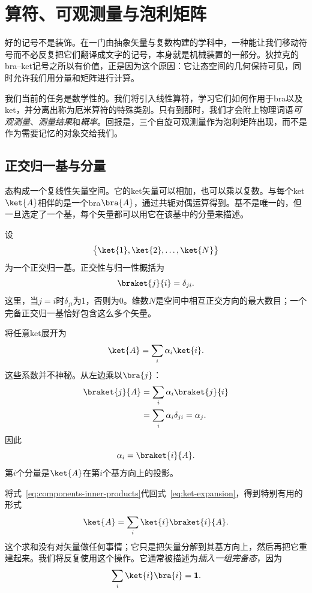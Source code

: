 \chapter{算符、可观测量与泡利矩阵}

好的记号不是装饰。在一门由抽象矢量与复数构建的学科中，一种能让我们移动符号而不必反复把它们翻译成文字的记号，本身就是机械装置的一部分。狄拉克的bra--ket记号之所以有价值，正是因为这个原因：它让态空间的几何保持可见，同时允许我们用分量和矩阵进行计算。

我们当前的任务是数学性的。我们将引入线性算符，学习它们如何作用于bra以及ket，并分离出称为厄米算符的特殊类别。只有到那时，我们才会附上物理词语\emph{可观测量}、\emph{测量结果}和\emph{概率}。回报是，三个自旋可观测量作为泡利矩阵出现，而不是作为需要记忆的对象交给我们。

\section{正交归一基与分量}

态构成一个复线性矢量空间。它的ket矢量可以相加，也可以乘以复数。与每个ket\(\ket{A}\)相伴的是一个bra\(\bra{A}\)，通过共轭对偶运算得到。基不是唯一的，但一旦选定了一个基，每个矢量都可以用它在该基中的分量来描述。

设
\[
\bigl\{\ket{1},\ket{2},\ldots,\ket{N}\bigr\}
\]
为一个正交归一基。正交性与归一性概括为
\begin{equation}
\braket{j}{i}=\delta_{ji}.
\label{eq:orthonormal-basis}
\end{equation}
这里，当\(j=i\)时\(\delta_{ji}\)为1，否则为0。维数\(N\)是空间中相互正交方向的最大数目；一个完备正交归一基恰好包含这么多个矢量。

将任意ket展开为
\begin{equation}
\ket{A}=\sum_i \alpha_i\ket{i}.
\label{eq:ket-expansion}
\end{equation}
这些系数并不神秘。从左边乘以\(\bra{j}\)：
\begin{align}
\braket{j}{A}
 &=\sum_i\alpha_i\braket{j}{i} \\
 &=\sum_i\alpha_i\delta_{ji}
 =\alpha_j.
\end{align}
因此
\begin{equation}
\alpha_i=\braket{i}{A}.
\label{eq:components-inner-products}
\end{equation}
第\(i\)个分量是\(\ket{A}\)在第\(i\)个基方向上的投影。

将式~\eqref{eq:components-inner-products}代回式~\eqref{eq:ket-expansion}，得到特别有用的形式
\begin{equation}
\ket{A}=\sum_i\ket{i}\braket{i}{A}.
\label{eq:ket-completeness-action}
\end{equation}
这个求和没有对矢量做任何事情；它只是把矢量分解到其基方向上，然后再把它重建起来。我们将反复使用这个操作。它通常被描述为\emph{插入一组完备态}，因为
\begin{equation}
\sum_i\ket{i}\bra{i}=\mathbf 1.
\label{eq:resolution-identity}
\end{equation}

